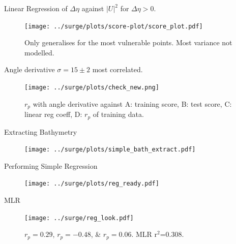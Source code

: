 \begin{frame}{Linear Regression of $ \Delta \eta$ against $|U|^2$ for $ \Delta\eta>0$.  }
\vspace{-20pt}
\begin{figure}[htb!]
    \centering
    \hspace{-10pt}
    \texttt{[image: ../surge/plots/score-plot/score\_plot.pdf]}
    \vspace{-7pt}
   \caption{Only generalises for the most vulnerable points. Most variance not modelled.}
    \label{fig:}
\end{figure}
\end{frame}

\begin{frame}{Angle derivative $\sigma=15\pm2$ most correlated.   }
\vspace{-20pt}
\begin{figure}[htb!]
    \centering
    \hspace{-10pt}
    \texttt{[image: ../surge/plots/check\_new.png]}
    \vspace{-7pt}
    \caption{$r_p$ with angle derivative against A: training score,
    B: test score, C: linear reg coeff,
    D: $r_p$ of training data.}
    \label{fig:}
\end{figure}
\end{frame}

\begin{frame}{Extracting Bathymetry}
\vspace{-30pt}
\begin{figure}[htb!]
    \centering
    \texttt{[image: ../surge/plots/simple\_bath\_extract.pdf]}
\end{figure}
\end{frame}

\begin{frame}{Performing Simple Regression }
\vspace{-20pt}
\begin{figure}[htb!]
    \centering
    \hspace{-10pt}
    \texttt{[image: ../surge/plots/reg\_ready.pdf]}
    \vspace{-7pt}
    \label{fig:}
\end{figure}
\end{frame}

\begin{frame}{MLR }
\vspace{-20pt}
\begin{figure}[htb!]
    \centering
    \hspace{-10pt}
    \texttt{[image: ../surge/reg\_look.pdf]}
    \vspace{-7pt}
   \caption{$r_p =0.29$, $r_p =-0.48$, &  $r_p=0.06$. MLR r$^2$=0.308.   }
    \label{fig:}
\end{figure}
\end{frame}


